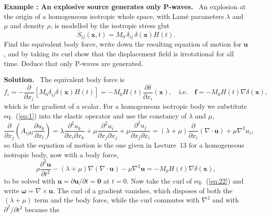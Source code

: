 \documentclass[a4paper,12pt]{paper}
\newcounter{example}
\renewenvironment{example}[1]{%
  \refstepcounter{example}%
  \begin{mdframed}[linewidth=1pt,innertopmargin=6pt,innerbottommargin=6pt]%
  \noindent\textbf{Example \theexample: #1.}\ }{%
  \end{mdframed}}
\newenvironment{solution}{\par\noindent\textbf{Solution.}\ }{\par\medskip}
\begin{document}
\begin{example}{An explosive source generates only P-waves}
An explosion at the origin of a homogeneous isotropic whole space, with Lam\'{e}
parameters $\lambda$ and $\mu$ and density $\rho$, is modelled by the isotropic stress glut
\begin{equation*}
\overline{S}_{ij}(\mathbf{x},t)=M_{0}\,\delta_{ij}\,\delta(\mathbf{x})H(t).
\end{equation*}
Find the equivalent body force, write down the resulting equation of motion for
$\mathbf{u}$, and by taking its curl show that the displacement field is irrotational for
all time. Deduce that only P-waves are generated.
\end{example}

\begin{solution}
The equivalent body force is
\begin{equation}
f_{i}=-\frac{\partial}{\partial x_{j}}\left[M_{0}\delta_{ij}\delta(\mathbf{x})H(t)\right]
=-M_{0}H(t)\frac{\partial\delta}{\partial x_{i}}(\mathbf{x}),
\quad\text{i.e.}\quad
\mathbf{f}=-M_{0}H(t)\nabla\delta(\mathbf{x}),
\label{eq:20}
\end{equation}
which is the gradient of a scalar. For a homogeneous isotropic body we substitute
eq.~(\ref{eq:1}) into the elastic operator and use the constancy of $\lambda$ and $\mu$,
\begin{equation}
\frac{\partial}{\partial x_{j}}\left(A_{ijkl}\frac{\partial u_{k}}{\partial x_{l}}\right)
=\lambda\frac{\partial^{2}u_{k}}{\partial x_{i}\partial x_{k}}
+\mu\frac{\partial^{2}u_{i}}{\partial x_{j}\partial x_{j}}
+\mu\frac{\partial^{2}u_{j}}{\partial x_{j}\partial x_{i}}
=(\lambda+\mu)\frac{\partial}{\partial x_{i}}\left(\nabla\cdot\mathbf{u}\right)+\mu\nabla^{2}u_{i},
\label{eq:21}
\end{equation}
so that the equation of motion is the one given in Lecture~13 for a homogeneous isotropic
body, now with a body force,
\begin{equation}
\rho\frac{\partial^{2}\mathbf{u}}{\partial t^{2}}
-(\lambda+\mu)\nabla(\nabla\cdot\mathbf{u})-\mu\nabla^{2}\mathbf{u}
=-M_{0}H(t)\nabla\delta(\mathbf{x}),
\label{eq:22}
\end{equation}
to be solved with $\mathbf{u}=\partial\mathbf{u}/\partial t=\mathbf{0}$ at $t=0$. Now take
the curl of eq.~(\ref{eq:22}) and write $\bm{\omega}=\nabla\times\mathbf{u}$. The curl of
a gradient vanishes, which disposes of both the $(\lambda+\mu)$ term and the body force,
while the curl commutes with $\nabla^{2}$ and with $\partial^{2}/\partial t^{2}$ because the

\end{solution}
\end{document}
